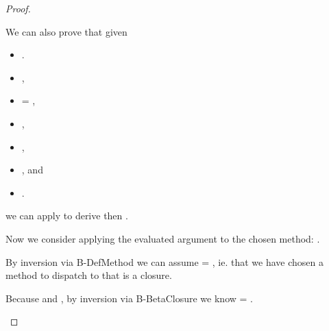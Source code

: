 \begin{lemma}
\begin{proof}
\begin{case}[B-BetaMulti]
\begin{itemize}
\begin{subcase}[T-App]
  We can also prove that given
        \begin{itemize}
          \item
  \judgementrewrite {\propenv{}} {} 
  {
              {}
              {\x{}}}
             {
                         {}
                         {\x{}}}
                       {\replacefor
                         {}
                         {}
                         {\x{}}}
                       {}.
    \item
  \judgementtwo {\propenv{}} {} {},
                     \item
         = {\true{}}, 
      \item
        \satisfies{\openv{}}{\propenv{}},
    \item
                       {\replacefor
                         {}
                         {}
                         {\x{}}}
  {}{\filterset {\thenprop {\propp{}}} {\elseprop {\propp{}}}},
          \item
        \inpropenv{\thenprop{\propp{}}}{\thenprop{\propp{}}}, and
    \item
        \inpropenv{\elseprop{\propp{}}}{\elseprop{\propp{}}}.
        \end{itemize}
  we can apply  to derive
  then {\satisfies{\openv{}}{\thenprop{\propp{}}}}.

   Now we consider applying the evaluated argument to the chosen method:
  \opsem {\openv{}}
         { {}}
         {\val{}}.

  By inversion via B-DefMethod we can assume {} = {}, 
  ie. that we have chosen a method to dispatch to that is a closure.

  Because 
  \opsem {\openv{}}
         { {}}
         {\val{}}
         and
    ,
  by inversion via B-BetaClosure we know {\val{}} = {}.


\end{subcase}
\end{itemize}
\end{case}
\end{proof}
\end{lemma}
